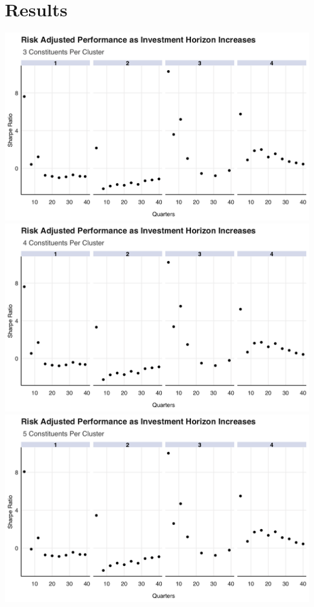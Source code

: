 \documentclass[11pt,preprint, authoryear]{elsarticle}
\numberwithin{equation}{section}
\numberwithin{figure}{section}
\numberwithin{table}{section}
\begin{document}
\newpage

\hypertarget{results}{%
\section{\texorpdfstring{Results
\label{Results}}{Results }}\label{results}}

\includegraphics{images/3_Cluster.png}
\includegraphics{images/4_Cluster.png}
\includegraphics{images/5_Cluster.png}
\end{document}

